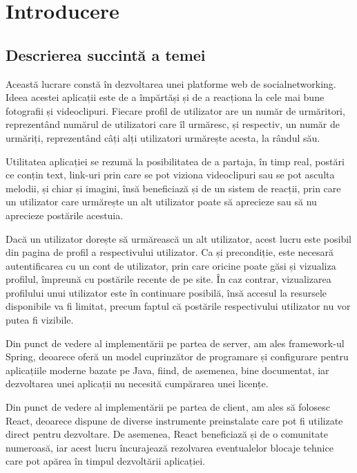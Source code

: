 \chapter{Introducere}
\section{Descrierea succintă a temei}

Această lucrare constă în dezvoltarea unei platforme web de social\newline networking. Ideea acestei aplicații este de a împărtăși și de a reacționa la cele mai bune fotografii și videoclipuri. Fiecare profil de utilizator are un număr de urmăritori, reprezentând numărul de utilizatori care îl urmăresc, și respectiv, un număr de urmăriți, reprezentând câți alți utilizatori urmărește acesta, la rândul său.\newline

Utilitatea aplicației se rezumă la posibilitatea de a partaja, în timp real, postări ce conțin text, link-uri prin care se pot viziona videoclipuri sau se pot asculta melodii, și chiar și imagini, însă beneficiază și de un sistem de reacții, prin care un utilizator care urmărește un alt utilizator poate să aprecieze sau să nu aprecieze postările acestuia.\newline

Dacă un utilizator dorește să urmărească un alt utilizator, acest lucru este posibil din pagina de profil a respectivului utilizator. Ca și precondiție, este necesară autentificarea cu un cont de utilizator, prin care oricine poate găsi și vizualiza profilul, împreună cu postările recente de pe site. În caz contrar, vizualizarea profilului unui utilizator este în continuare posibilă, însă accesul la resursele disponibile va fi limitat, precum faptul că postările respectivului utilizator nu vor putea fi vizibile.\newline

Din punct de vedere al implementării pe partea de server, am ales framework-ul Spring\cite{.springdoc}, deoarece oferă un model cuprinzător de programare și configurare pentru aplicațiile moderne bazate pe Java, fiind, de asemenea, bine documentat, iar dezvoltarea unei aplicații nu necesită cumpărarea unei licențe.\newline

Din punct de vedere al implementării pe partea de client, am ales să folosesc React\cite{.reactdoc}, deoarece dispune de diverse instrumente preinstalate care pot fi utilizate direct pentru dezvoltare. De asemenea, React beneficiază și de o comunitate numeroasă, iar acest lucru încurajează rezolvarea eventualelor blocaje tehnice care pot apărea în timpul dezvoltării aplicației.\newline

